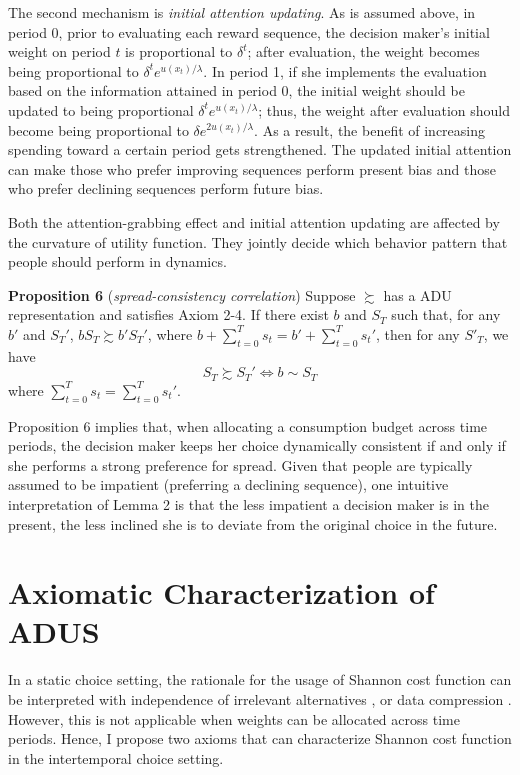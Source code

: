 \documentclass[
  12pt,
]{article}
\begin{document}
The second mechanism is \emph{initial attention updating}. As is assumed
above, in period 0, prior to evaluating each reward sequence, the
decision maker's initial weight on period \(t\) is proportional to
\(\delta^t\); after evaluation, the weight becomes being proportional to
\(\delta^t e^{u(x_t)/\lambda}\). In period 1, if she implements the
evaluation based on the information attained in period 0, the initial
weight should be updated to being proportional
\(\delta^t e^{u(x_t)/\lambda}\); thus, the weight after evaluation
should become being proportional to \(\delta e^{2u(x_t)/\lambda}\). As a
result, the benefit of increasing spending toward a certain period gets
strengthened. The updated initial attention can make those who prefer
improving sequences perform present bias and those who prefer declining
sequences perform future bias.

Both the attention-grabbing effect and initial attention updating are
affected by the curvature of utility function. They jointly decide which
behavior pattern that people should perform in dynamics.

\textbf{Proposition 6} (\emph{spread-consistency correlation}) Suppose
\(\succsim\) has a ADU representation and satisfies Axiom 2-4. If there
exist \(b\) and \(S_T\) such that, for any \(b'\) and \(S_T'\),
\(bS_T\succsim b'S_T'\), where
\(b+\sum_{t=0}^Ts_t=b'+\sum_{t=0}^Ts_t'\), then for any \(S'_T\), we
have \[S_T \succsim S_T' \Longleftrightarrow b\sim S_T\]where
\(\sum_{t=0}^Ts_t=\sum_{t=0}^Ts_t'\).

Proposition 6 implies that, when allocating a consumption budget across
time periods, the decision maker keeps her choice dynamically consistent
if and only if she performs a strong preference for spread. Given that
people are typically assumed to be impatient (preferring a declining
sequence), one intuitive interpretation of Lemma 2 is that the less
impatient a decision maker is in the present, the less inclined she is
to deviate from the original choice in the future.

\hypertarget{axiomatic-characterization-of-adus}{%
\section{Axiomatic Characterization of
ADUS}\label{axiomatic-characterization-of-adus}}

In a static choice setting, the rationale for the usage of Shannon cost
function can be interpreted with independence of irrelevant alternatives
\citep{matejka_rational_2015}, or data compression
\citep{caplin_rationally_2022}. However, this is not applicable when
weights can be allocated across time periods. Hence, I propose two
axioms that can characterize Shannon cost function in the intertemporal
choice setting.
\end{document}
